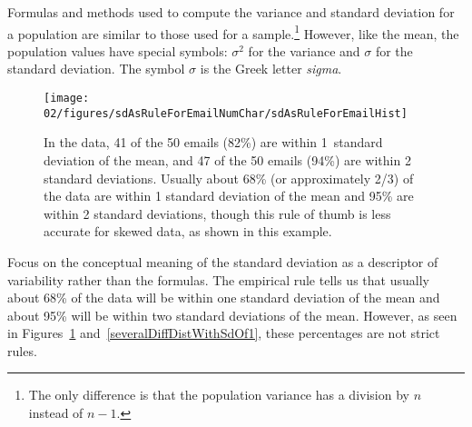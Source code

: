 Formulas and methods used to compute the variance and standard deviation for a population are similar to those used for a sample.\footnote{The only difference is that the population variance has a division by $n$ instead of $n-1$.} However, like the mean, the population values have special symbols: $\sigma_{}^2$ for the variance and $\sigma$ for the standard deviation. The symbol $\sigma$  is the Greek letter \emph{sigma}.

\begin{figure}
\centering
\texttt{[image: 02/figures/sdAsRuleForEmailNumChar/sdAsRuleForEmailHist]}
\caption{In the  data, 41 of the 50 emails (82\%) are within 1~standard deviation of the mean, and 47 of the 50 emails (94\%) are within 2 standard deviations. Usually about 68\% (or approximately 2/3) of the data are within 1 standard deviation of the mean and 95\% are within 2 standard deviations, though this rule of thumb is less accurate for skewed data, as shown in this example.}
\label{sdAsRuleForEmailHist}
\end{figure}


\begin{tipBox}{
Focus on the conceptual meaning of the standard deviation as a descriptor of variability rather than the formulas. The empirical rule tells us that usually about 68\% of the data will be within one standard deviation of the mean and about 95\% will be within two standard deviations of the mean. However, as seen in Figures~\ref{sdAsRuleForEmailHist} and~\ref{severalDiffDistWithSdOf1}, these percentages are not strict rules.\footnotemark} 
\end{tipBox}

